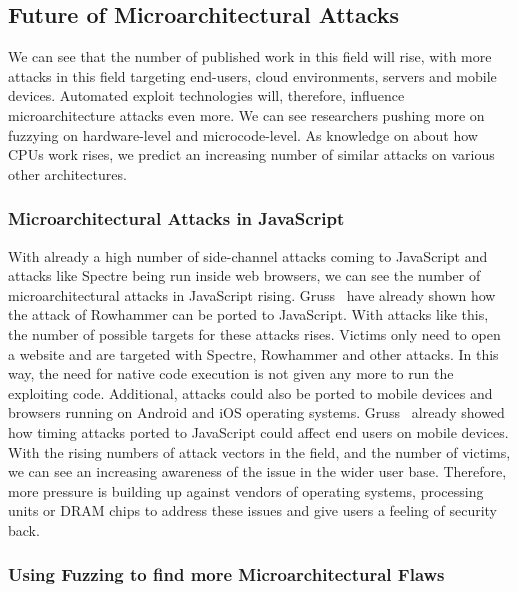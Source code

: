 \subsection{Future of Microarchitectural Attacks}

We can see that the number of published work in this field will rise, with more
attacks in this field targeting end-users, cloud environments, servers and
mobile devices. Automated exploit technologies will, therefore, influence
microarchitecture attacks even more. We can see researchers pushing more on
fuzzying on hardware-level and microcode-level. As knowledge on about how CPUs
work rises, we predict an increasing number of similar attacks on various other
architectures.

\subsubsection{Microarchitectural Attacks in JavaScript}

With already a high number of side-channel attacks coming to JavaScript and
attacks like Spectre being run inside web browsers, we can see the number of
microarchitectural attacks in JavaScript rising. Gruss~\etal\cite{rowhammerjs}
have already shown how the attack of Rowhammer can be ported to JavaScript. With
attacks like this, the number of possible targets for these attacks rises.
Victims only need to open a website and are targeted with Spectre, Rowhammer
and other attacks. In this way, the need for native code execution is not given
any more to run the exploiting code. Additional, attacks could also be ported
to mobile devices and browsers running on Android and iOS operating systems.
Gruss~\etal\cite{keytimejs} already showed how timing attacks ported to
JavaScript could affect end users on mobile devices. With the rising numbers of
attack vectors in the field, and the number of victims, we can see an increasing
awareness of the issue in the wider user base. Therefore, more pressure is
building up against vendors of operating systems, processing units or DRAM
chips to address these issues and give users a feeling of security back.

\subsubsection{Using Fuzzing to find more Microarchitectural Flaws}

